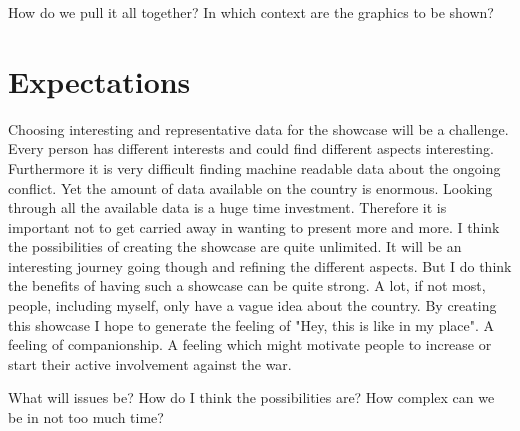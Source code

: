 \documentclass[
a4paper,     %
12pt         %
]{scrartcl}  %
\begin{document}
How do we pull it all together? In which context are the graphics to be shown?

\section{Expectations}
Choosing interesting and representative data for the showcase will be a challenge. Every person has different interests and could find different aspects interesting. Furthermore it is very difficult finding machine readable data about the ongoing conflict. Yet the amount of data available on the country is enormous. Looking through all the available data is a huge time investment. Therefore it is important not to get carried away in wanting to present more and more.
I think the possibilities of creating the showcase are quite unlimited. It will be an interesting journey going though and refining the different aspects. But I do think the benefits of having such a showcase can be quite strong. A lot, if not most, people, including myself, only have a vague idea about the country. By creating this showcase I hope to generate the feeling of "Hey, this is like in my place". A feeling of companionship. A feeling which might motivate people to increase or start their active involvement against the war.

What will issues be? How do I think the possibilities are? How complex can we be in not too much time?




% 

% 
\end{document}
